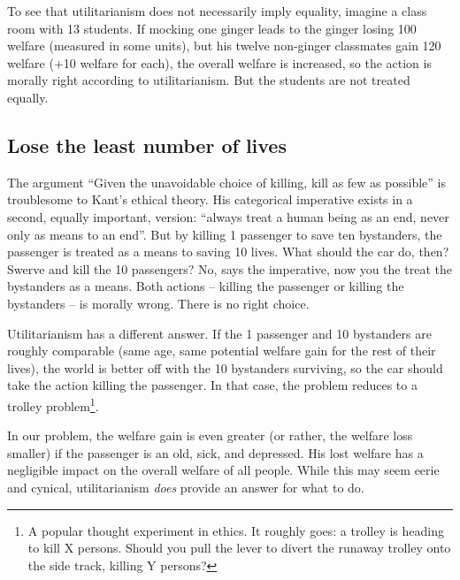 To see that utilitarianism does not necessarily imply equality, imagine a class room with 13 students. If mocking one ginger leads to the ginger losing 100 welfare (measured in some units), but his twelve non-ginger classmates gain 120 welfare (+10 welfare for each), the overall welfare is increased, so the action is morally right according to utilitarianism. But the students are not treated equally. 

\subsection{Lose the least number of lives}
The argument “Given the unavoidable choice of killing, kill as few as possible” is troublesome to Kant’s ethical theory. His categorical imperative exists in a second, equally important, version: “always treat a human being as an end, never only as
means to an end”. But by killing 1 passenger to save ten bystanders, the passenger is treated as a means to saving 10 lives. What should the car do, then? Swerve and kill the 10 passengers? No, says the imperative, now you the treat the bystanders as a means.
Both actions – killing the passenger or killing the bystanders – is morally wrong. There is no right choice.

Utilitarianism has a different answer. If the 1 passenger and 10 bystanders are roughly comparable (same age, same potential welfare gain for the rest of their lives), the world is better off with the 10 bystanders surviving, so the car should take the action killing the passenger. In that case, the problem reduces to a trolley problem\footnote{A popular thought experiment in ethics. It roughly goes: a trolley is heading to kill X persons. Should you pull the lever to divert the runaway trolley onto the side track, killing Y persons?}.

In our problem, the welfare gain is even greater (or rather, the welfare loss smaller) if the passenger is an old, sick, and depressed. His lost welfare has a negligible impact on the overall welfare of all people. While this may seem eerie and cynical, utilitarianism \textit{does} provide an answer for what to do. 

